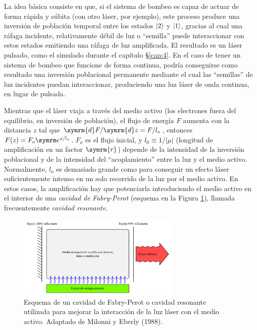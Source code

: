 La idea básica consiste en que, si el sistema de bombeo es capaz de actuar de forma rápida y súbita (con otro láser, por ejemplo), este proceso produce una inversión de población temporal entre los estados $\left|2\right\rangle$ y $\left|1\right\rangle$, gracias al cual una ráfaga incidente, relativamente débil de luz o \enquote{semilla} puede interaccionar con estos estados emitiendo una ráfaga de luz amplificada. El resultado es un láser pulsado, como el simulado durante el capítulo \S\ref{cap:4}. En el caso de tener un sistema de bombeo que funcione de forma continua, podría conseguirse como resultado una inversión poblacional permanente mediante el cual las \enquote{semillas} de luz incidentes puedan interaccionar, produciendo una luz láser de onda continua, en lugar de pulsada.

Mientras que el láser viaja a través del medio activo (los electrones fuera del equilibrio, en inversión de población), el flujo de energía $F$ aumenta con la distancia $z$ tal que $\symrm{d}F/\symrm{d}z = F/l_{o}$, entonces $F(z) = F_{o}\eu^{z/l_{o}}$. $F_{o}$ es el flujo inicial, y $l_{0} \equiv 1/|\mu|$ (longitud de amplificación en un factor $\symrm{r}$) depende de la intensidad de la inversión poblacional y de la intensidad del \enquote{acoplamiento} entre la luz y el medio activo. Normalmente, $l_{o}$ es demasiado grande como para conseguir un efecto láser suficientemente intenso en un solo recorrido de la luz por el medio activo. En estos casos, la amplificación hay que potenciarla introduciendo el medio activo en el interior de una \emph{cavidad de Fabry-Perot} (esquema en la Figura \ref{fig:ch1_cavidad}), llamada frecuentemente \emph{cavidad resonante}.

\begin{figure}[htbp]
  \centering
  \includegraphics[width=0.7\textwidth]{Figuras/ch1_cavidad.pdf}
  \caption{Esquema de un cavidad de Fabry-Perot o cavidad resonante utilizada para mejorar la interacción de la luz láser con el medio activo. Adaptado de Milonni y Eberly (1988)\autocite{Milonni1988}.}
  \label{fig:ch1_cavidad}
\end{figure}

